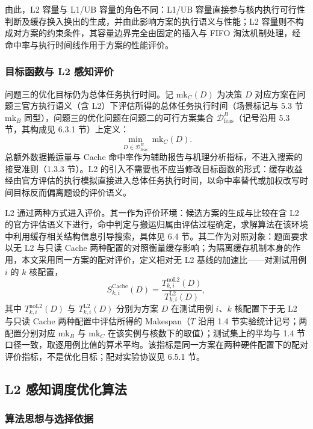 由此，L2 容量与 L1/UB 容量的角色不同：L1/UB 容量直接参与核内执行可行性判断及缓存换入换出的生成，并由此影响方案的执行语义与性能；L2 容量则不构成对方案的约束条件，其容量边界完全由固定的插入与 FIFO 淘汰机制处理，经命中率与执行时间线作用于方案的性能评价。

\subsubsection{目标函数与 L2 感知评价}

问题三的优化目标仍为总体任务执行时间。记 $\mathrm{mk}_C(D)$ 为决策 $D$ 对应方案在问题三官方执行语义（含 L2）下评估所得的总体任务执行时间（场景标记与 5.3 节 $\mathrm{mk}_B$ 同型），问题三的优化问题在问题二的可行方案集合 $\mathcal{D}_{\mathrm{feas}}^{B}$（记号沿用 5.3 节，其构成见 6.3.1 节）上定义：
\[ \min_{D\in\mathcal{D}_{\mathrm{feas}}^{B}}\ \mathrm{mk}_C(D). \]
总额外数据搬运量与 Cache 命中率作为辅助报告与机理分析指标，不进入搜索的接受准则（1.3.3 节）。L2 的引入不需要也不应当修改目标函数的形式：缓存收益经由官方评估的执行模拟直接进入总体任务执行时间，以命中率替代或加权改写时间目标反而偏离题设的评价语义。

L2 通过两种方式进入评价。其一作为评价环境：候选方案的生成与比较在含 L2 的官方评估语义下进行，命中判定与搬运归属由评估过程确定，求解算法在该环境中利用缓存相关结构信息引导搜索，具体见 6.4 节。其二作为对照对象：题面要求以无 L2 与只读 Cache 两种配置的对照衡量缓存影响；为隔离缓存机制本身的作用，本文采用同一方案的配对评价，定义相对无 L2 基线的加速比——对测试用例 $i$ 的 $k$ 核配置，
\[ S^{\mathrm{Cache}}_{k,i}(D)=\frac{T^{\mathrm{noL2}}_{k,i}(D)}{T^{\mathrm{L2}}_{k,i}(D)}, \]
其中 $T^{\mathrm{noL2}}_{k,i}(D)$ 与 $T^{\mathrm{L2}}_{k,i}(D)$ 分别为方案 $D$ 在测试用例 $i$、$k$ 核配置下于无 L2 与只读 Cache 两种配置中评估所得的 Makespan（$T$ 沿用 1.4 节实验统计记号；两配置分别对应 $\mathrm{mk}_B$ 与 $\mathrm{mk}_C$ 在该实例与核数下的取值）；测试集上的平均与 1.4 节口径一致，取逐用例比值的算术平均。该指标是同一方案在两种硬件配置下的配对评价指标，不是优化目标；配对实验协议见 6.5.1 节。

\subsection{L2 感知调度优化算法}

\subsubsection{算法思想与选择依据}

